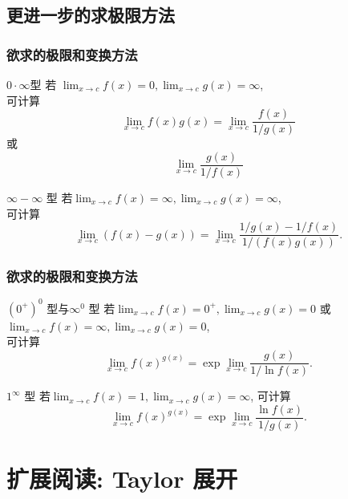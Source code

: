 \documentclass[
10pt,
aspectratio=43,
]{beamer}
\begin{document}
\subsection{更进一步的求极限方法}
\begin{frame} \frametitle{欲求的极限和变换方法}
	\everymath{\displaystyle}
	\begin{block}{$0\cdot\infty$型}
		若 $\lim _{x \rightarrow c} f(x)=0, \lim _{x \rightarrow c} g(x)=\infty$, \\
		可计算
		$$\lim _{x \rightarrow c} f(x) g(x)=\lim _{x \rightarrow c} \frac{f(x)}{1 / g(x)}$$ 或 $$\lim _{x \rightarrow c} \frac{g(x)}{1 / f(x)}$$
	\end{block}
	\pause
	\begin{block}{$\infty-\infty$ 型}
		若$\lim _{x \rightarrow c} f(x)=\infty, \lim _{x \rightarrow c} g(x)=\infty$, \\
		可计算$$\lim _{x \rightarrow c}(f(x)-g(x))=\lim _{x \rightarrow c} \frac{1 / g(x)-1 / f(x)}{1 /(f(x) g(x))}.$$
	\end{block}

\end{frame}

\begin{frame} \frametitle{欲求的极限和变换方法}
	\everymath{\displaystyle}
	\begin{block}{$(0^+)^0$ 型与$\infty^0$ 型}
		若$\lim _{x \rightarrow c} f(x)=0^{+}, \lim _{x \rightarrow c} g(x)=0$ 或 $\lim _{x \rightarrow c} f(x)=\infty, \lim _{x \rightarrow c} g(x)=0$, \\
		可计算$$\lim _{x \rightarrow c} f(x)^{g(x)}=\exp \lim _{x \rightarrow c} \frac{g(x)}{1 / \ln f(x)}.$$
	\end{block}
	\pause
	\begin{block}{$1^\infty$ 型}
		若$\lim _{x \rightarrow c} f(x)=1, \lim _{x \rightarrow c} g(x)=\infty$, 可计算 \\
		$$\lim _{x \rightarrow c} f(x)^{g(x)}=\exp \lim _{x \rightarrow c} \frac{\ln f(x)}{1 / g(x)}.$$
	\end{block}
\end{frame}

\section{扩展阅读: Taylor 展开}
\end{document}
